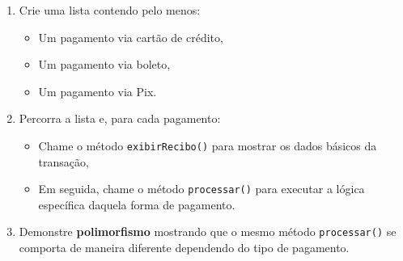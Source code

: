 \documentclass{article}
\begin{document}
\begin{enumerate}
    \item Crie uma lista contendo pelo menos:
    \begin{itemize}
        \item Um pagamento via cartão de crédito,
        \item Um pagamento via boleto,
        \item Um pagamento via Pix.
    \end{itemize}

    \item Percorra a lista e, para cada pagamento:
    \begin{itemize}
        \item Chame o método \texttt{exibirRecibo()} para mostrar os dados básicos da transação,
        \item Em seguida, chame o método \texttt{processar()} para executar a lógica específica daquela forma de pagamento.
    \end{itemize}

    \item Demonstre \textbf{polimorfismo} mostrando que o mesmo método \texttt{processar()} se comporta de maneira diferente dependendo do tipo de pagamento.
\end{enumerate}
\end{document}
